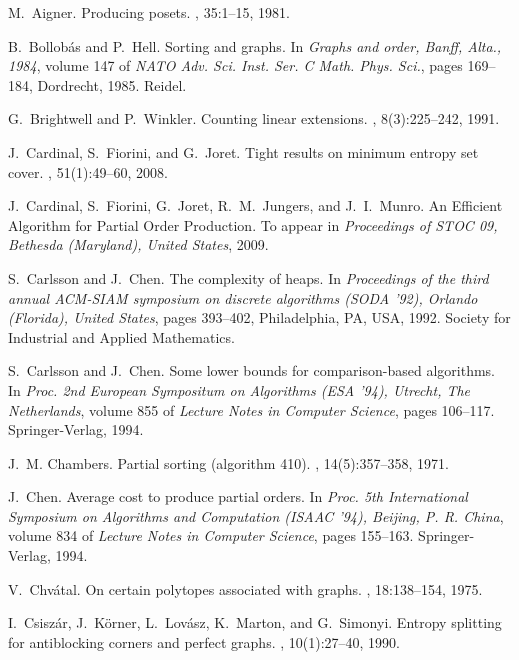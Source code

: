 \documentclass[12pt,oneside]{article}
\begin{document}
\begin{thebibliography}{10}

M.~Aigner.
\newblock Producing posets.
, 35:1--15, 1981.

B.~Bollob{\'a}s and P.~Hell.
\newblock Sorting and graphs.
\newblock In {\em Graphs and order, Banff, Alta., 1984}, volume 147 of {\em
  NATO Adv. Sci. Inst. Ser. C Math. Phys. Sci.}, pages 169--184, Dordrecht,
  1985. Reidel.

G.~Brightwell and P.~Winkler.
\newblock Counting linear extensions.
, 8(3):225--242, 1991.

J.~Cardinal, S.~Fiorini, and G.~Joret.
\newblock Tight results on minimum entropy set cover.
, 51(1):49--60, 2008.

J.~Cardinal, S.~Fiorini, G.~Joret, R.~M.~Jungers, and J.~I.~Munro.
\newblock An Efficient Algorithm for Partial Order Production.
\newblock To appear in {\em Proceedings of STOC 09, Bethesda (Maryland), United States}, 2009.

S.~Carlsson and J.~Chen.
\newblock The complexity of heaps.
\newblock In {\em Proceedings of the third annual ACM-SIAM symposium on
  discrete algorithms (SODA '92), Orlando (Florida), United States}, pages
  393--402, Philadelphia, PA, USA, 1992. Society for Industrial and Applied
  Mathematics.

S.~Carlsson and J.~Chen.
\newblock Some lower bounds for comparison-based algorithms.
\newblock In {\em Proc. 2nd European Sympositum on Algorithms (ESA '94),
  Utrecht, The Netherlands}, volume 855 of {\em Lecture Notes in Computer Science},
  pages 106--117. Springer-Verlag, 1994.

J.~M. Chambers.
\newblock Partial sorting (algorithm 410).
, 14(5):357--358, 1971.

J.~Chen.
\newblock Average cost to produce partial orders.
\newblock In {\em Proc. 5th International
  Symposium on Algorithms and Computation (ISAAC '94), Beijing, P. R. China},
  volume 834 of {\em Lecture Notes in Computer Science},
  pages 155--163. Springer-Verlag, 1994.

V.~Chv{\'a}tal.
\newblock On certain polytopes associated with graphs.
, 18:138--154, 1975.

I.~Csisz{\'a}r, J.~K{\"o}rner, L.~Lov{\'a}sz, K.~Marton, and G.~Simonyi.
\newblock Entropy splitting for antiblocking corners and perfect graphs.
, 10(1):27--40, 1990.


\end{thebibliography}
\end{document}
